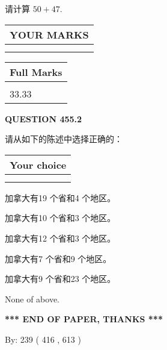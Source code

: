 \documentclass{ctexart}
\begin{document}
  
 
请计算 $ %
50 +  %
47 $.
 

 

 
  
\vspace{0.2in}
  
\noindent\begin{tabular}{|l|}
\hline
 YOUR MARKS  \\
\hline
 \\ 
 \\ 
\hline
\end{tabular}
\hspace{0.05in} \begin{tabular}{|l|}
\hline
 Full Marks  \\
\hline
 \\ 
33.33 \\
\hline
\end{tabular}
{\textbf{\Large{QUESTION
455.2 
}}}
  
  
请从如下的陈述中选择正确的：
  
  
\noindent\hspace{3.0in} \begin{tabular}{|l|}
\hline
Your choice \\
\hline
 \\ 
 \\ 
\hline
\end{tabular}
  
  
 
 
加拿大有19 个省和4 个地区。
 
 
加拿大有10 个省和3 个地区。
 
 
加拿大有12 个省和3 个地区。
 
 
加拿大有7 个省和9 个地区。
 
 
加拿大有9 个省和23 个地区。
 
 
 None of above.
 
 
   
   
 \vspace{0.2in}
 
   
   
   
   
\vspace{1.0in} 
{\textbf{\large{ *** END OF PAPER, THANKS *** }}} 
   
   
\hspace{1.0in} By: 
 239 ( 416 ,  613 )
   
\end{document}
